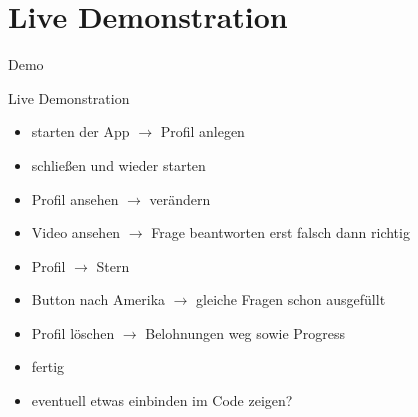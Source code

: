 \documentclass[10pt,fleqn]{beamer}
\begin{document}
\section{Live Demonstration}
\begin{frame}[c]{Demo}
	\begin{block}{}
		\begin{center}
			\begin{Huge}
			Live Demonstration
			\end{Huge}
		\end{center}
	\end{block}
\begin{itemize}
	\item starten der App $\rightarrow$ Profil anlegen
	\item schließen und wieder starten
	\item Profil ansehen $\rightarrow$ verändern
	\item Video ansehen $\rightarrow$ Frage beantworten erst falsch dann richtig
	\item Profil $\rightarrow$ Stern
	\item Button nach Amerika $\rightarrow$ gleiche Fragen schon ausgefüllt
	\item Profil löschen $\rightarrow$ Belohnungen weg sowie Progress
	\item fertig
	\item eventuell etwas einbinden im Code zeigen?
\end{itemize}
\end{frame}
\end{document}
